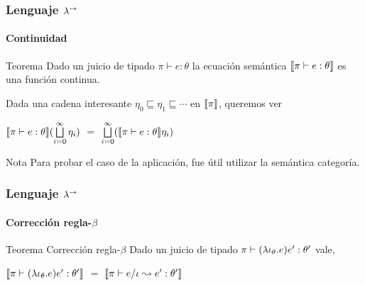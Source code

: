 \documentclass{beamer}
\begin{document}
\begin{frame}
\frametitle{Lenguaje $\lambda^{\rightarrow}$}
\framesubtitle{Continuidad}

\begin{block}{Teorema}
Dado un juicio de tipado $\pi \vdash e : \theta$ la ecuaci\'on sem\'antica
$\llbracket \pi \vdash e : \theta \rrbracket$ es una funci\'on continua.
\end{block}

\pause

\begin{block}{}
Dada una cadena interesante
$\eta_0 \sqsubseteq \eta_1 \sqsubseteq \cdots$ en $\llbracket \pi \rrbracket$, queremos ver

\begin{center}
$\llbracket \pi \vdash e : \theta \rrbracket(\bigsqcup\limits^{\infty}_{i=0} \eta_i)$
$=$ $\bigsqcup\limits^{\infty}_{i=0} (\llbracket \pi \vdash e : \theta \rrbracket\eta_i)$
\end{center}

\end{block}

\pause

\begin{block}{Nota}
Para probar el caso de la aplicación, fue útil utilizar la semántica 
categoría.
\end{block}

\end{frame}

\begin{frame}
\frametitle{Lenguaje $\lambda^{\rightarrow}$}
\framesubtitle{Corrección regla-$\beta$}

\begin{block}{Teorema Corrección regla-$\beta$}
Dado un juicio de tipado $\pi \vdash (\lambda \iota_{\theta} . e)e' : \theta'$ vale,

\begin{center}
$\llbracket \pi \vdash (\lambda \iota_{\theta} . e)e' : \theta' \rrbracket$ $=$
$\llbracket \pi \vdash e / \iota \leadsto e' : \theta' \rrbracket$
\end{center}
\end{block}
\end{frame}
\end{document}

